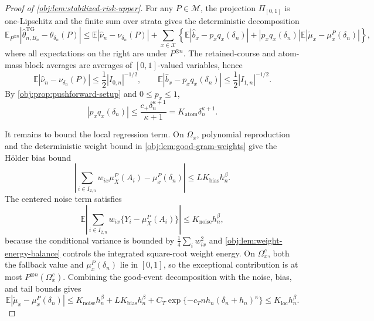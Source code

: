 \documentclass[11pt]{article}
\begin{document}
\begin{proof}[Proof of \cref{obj:lem:stabilized-risk-upper}]
For any \(P\in\mathcal M\), the projection \(\Pi_{[0,1]}\) is one-Lipschitz and the finite sum over strata gives the deterministic decomposition
\[
\mathbb E_{P^{\otimes n}}
\left|\widehat\theta^{\mathrm{TG}}_{n,B_n}-\theta_{\delta_n}(P)\right|
\le
\mathbb E|\widehat\nu_n-\nu_{\delta_n}(P)|
+
\sum_{x\in\mathcal X}
\left\{
\mathbb E|\widehat b_x-p_xq_x(\delta_n)|
+
|p_xq_x(\delta_n)|
\mathbb E|\widetilde\mu_x-\mu_x^P(\delta_n)|
\right\},
\]
where all expectations on the right are under \(P^{\otimes n}\). %
The retained-course and atom-mass block averages are averages of \([0,1]\)-valued variables, hence
\[
\mathbb E|\widehat\nu_n-\nu_{\delta_n}(P)|
\le
\frac12 |I_{0,n}|^{-1/2},
\qquad
\mathbb E|\widehat b_x-p_xq_x(\delta_n)|
\le
\frac12 |I_{1,n}|^{-1/2}.
\]
By \cref{obj:prop:pushforward-setup} and \(0\le p_x\le1\),
\[
|p_xq_x(\delta_n)|
\le
\frac{c_+\delta_n^{\kappa+1}}{\kappa+1}
=
K_{\mathrm{atom}}\delta_n^{\kappa+1}.
\]

It remains to bound the local regression term.  On \(\Omega_x\), polynomial reproduction and the deterministic weight bound in \cref{obj:lem:good-gram-weights} give the Hölder bias bound
\[
\left|
\sum_{i\in I_{2,n}}w_{ix}\mu_X^P(A_i)-\mu_x^P(\delta_n)
\right|
\le
LK_{\mathrm{bias}}h_n^\beta .
\]
The centered noise term satisfies
\[
\mathbb E
\left|
\sum_{i\in I_{2,n}}w_{ix}
\{Y_i-\mu_X^P(A_i)\}
\right|
\le
K_{\mathrm{noise}}h_n^\beta,
\]
because the conditional variance is bounded by \(\frac14\sum_i w_{ix}^2\) and
\cref{obj:lem:weight-energy-balance} controls the integrated square-root weight energy. %
On \(\Omega_x^c\), both the fallback value and \(\mu_x^P(\delta_n)\) lie in \([0,1]\), so the exceptional contribution is at most \(P^{\otimes n}(\Omega_x^c)\).  Combining the good-event decomposition with the noise, bias, and tail bounds gives
\[
\mathbb E|\widetilde\mu_x-\mu_x^P(\delta_n)|
\le
K_{\mathrm{noise}}h_n^\beta+LK_{\mathrm{bias}}h_n^\beta
+C_T\exp\{-c_T n h_n(\delta_n+h_n)^\kappa\}
\le
K_{\mathrm{loc}}h_n^\beta .
\]


\end{proof}
\end{document}
